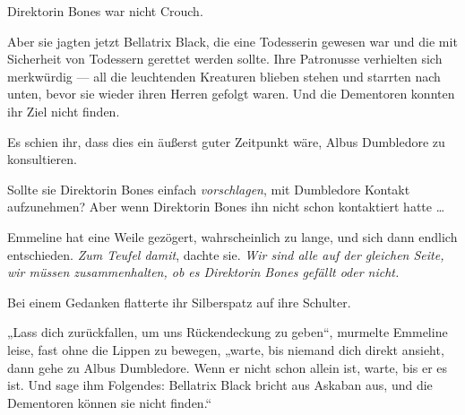 Direktorin Bones war nicht Crouch.

Aber sie jagten jetzt Bellatrix Black, die eine Todesserin gewesen war und die mit Sicherheit von Todessern gerettet werden sollte. Ihre Patronusse verhielten sich merkwürdig — all die leuchtenden Kreaturen blieben stehen und starrten nach unten, bevor sie wieder ihren Herren gefolgt waren. Und die Dementoren konnten ihr Ziel nicht finden.

Es schien ihr, dass dies ein äußerst guter Zeitpunkt wäre, Albus Dumbledore zu konsultieren.

Sollte sie Direktorin Bones einfach \emph{vorschlagen}, mit Dumbledore Kontakt aufzunehmen? Aber wenn Direktorin Bones ihn nicht schon kontaktiert hatte …

Emmeline hat eine Weile gezögert, wahrscheinlich zu lange, und sich dann endlich entschieden. \emph{Zum Teufel damit}, dachte sie. \emph{Wir sind alle auf der gleichen Seite, wir müssen zusammenhalten, ob es Direktorin Bones gefällt oder nicht.}

Bei einem Gedanken flatterte ihr Silberspatz auf ihre Schulter.

„Lass dich zurückfallen, um uns Rückendeckung zu geben“, murmelte Emmeline leise, fast ohne die Lippen zu bewegen, „warte, bis niemand dich direkt ansieht, dann gehe zu Albus Dumbledore. Wenn er nicht schon allein ist, warte, bis er es ist. Und sage ihm Folgendes: Bellatrix Black bricht aus Askaban aus, und die Dementoren können sie nicht finden.“

